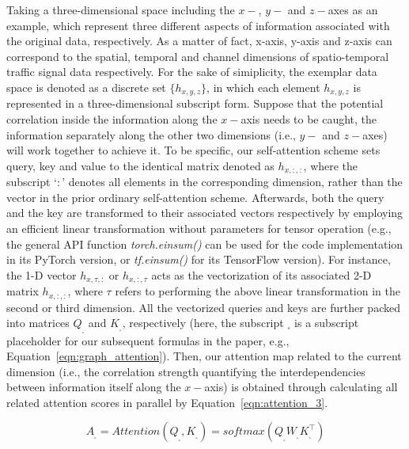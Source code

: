Taking a three-dimensional space including the $x-$, $y-$ and $z-$axes as an example, which represent three different aspects of information associated with the original data, respectively. As a matter of fact, x-axis, y-axis and z-axis can correspond to the spatial, temporal and channel dimensions of spatio-temporal traffic signal data respectively. For the sake of simiplicity, the exemplar data space is denoted as a discrete set $\{h_{x,y,z}\}$, in which each element  $h_{x,y,z}$ is represented in a three-dimensional subscript form. Suppose that the potential correlation inside the information along the $x-$axis needs to be caught, the information separately along the other two dimensions (i.e., $y-$ and $z-$axes) will work together to achieve it. To be specific, our self-attention scheme sets query, key and value to the identical matrix denoted as $h_{x,:,:}$, where the subscript ‘$:$’ denotes all elements in the corresponding dimension, rather than the vector in the prior ordinary self-attention scheme. Afterwards, both the query and the key are transformed to their associated vectors respectively by employing an efficient linear transformation without parameters for tensor operation (e.g., the general API function \textit{torch.einsum()} can be used for the code implementation in its PyTorch version, or \textit{tf.einsum()} for its TensorFlow version). For instance, the 1-D vector $h_{x,\tau,:}$ or $h_{x,:,\tau}$ acts as the vectorization of its associated 2-D matrix $h_{x,:,:}$, where $\tau$ refers to performing the above linear transformation in the second or third dimension. All the vectorized queries and keys are further packed into matrices $Q_{_\square}$ and $K_{_\square}$, respectively (here, the subscript ${_\square}$ is a subscript placeholder for our subsequent formulas in the paper, e.g., Equation~\ref{eqn:graph_attention}). Then, our attention map related to the current dimension (i.e., the correlation strength quantifying the interdependencies between information itself along the $x-$axis) is obtained through calculating all related attention scores in parallel by Equation~\ref{eqn:attention_3}.

\begin{equation}
    \label{eqn:attention_3}
    A_{_\square} = Attention(Q_{_\square}, K_{_\square}) = softmax(Q_{_\square} W_{_\square} K_{_\square}^\top)
\end{equation}

